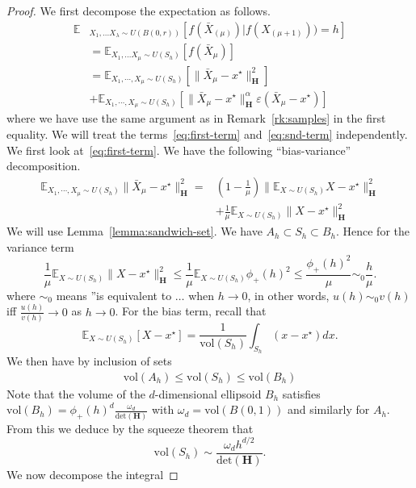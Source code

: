 \begin{proof}
We first decompose the expectation as follows.
\begin{align}
\mathbb{E}&_{X_{1},...X_{\lambda}\sim U(B(0,r))}  \left[f(\bar{X}_{(\mu)})|f(X_{(\mu+1)}))=h\right]\nonumber\\
 & =\mathbb{E}_{X_{1},...X_{\mu}\sim U(S_{h})}\left[f(\bar{X}_{\mu})\right]\nonumber\\
 & =\mathbb{E}_{X_{1},\cdots,X_{\mu}\sim U(S_{h})}\left[\lVert \bar{X}_{\mu}-x^\star\rVert_{\mathbf{H}}^2\right]\label{eq:first-term}\\
 &+\mathbb{E}_{X_{1},\cdots,X_{\mu}\sim U(S_{h})}\left[\lVert\bar{X}_{\mu}-x^\star\rVert^{\alpha}_{\mathbf{H}}\varepsilon(\bar{X}_{\mu}-x^\star)\right]\label{eq:snd-term}
\end{align}
where we have use the same argument as in Remark~\ref{rk:samples} in the first equality.
We will treat the terms~\eqref{eq:first-term} and~\eqref{eq:snd-term} independently. We first look at~\eqref{eq:first-term}. We have the following ``bias-variance'' decomposition.
\begin{align*}
\mathbb{E}_{X_{1},\cdots,X_{\mu}\sim U(S_{h})}\lVert\bar{X}_{\mu}-x^{\star}\rVert^{2}_{\mathbf{H}} 
=&(1-\frac{1}{\mu})\lVert\mathbb{E}_{X\sim U(S_{h})}X-x^{\star}\rVert^{2}_{\mathbf{H}}\\
&+\frac{1}{\mu}\mathbb{E}_{X\sim U(S_{h})}\lVert X-x^{\star}\rVert^{2}_{\mathbf{H}}
\end{align*}
We will use Lemma~\ref{lemma:sandwich-set}. We have $A_h\subset S_h\subset B_h$. Hence for the variance term
\[
\frac{1}{\mu}\mathbb{E}_{X\sim U(S_{h})}\lVert X-x^{\star}\rVert^{2}_{\mathbf{H}}\leq\frac{1}{\mu}\mathbb{E}_{X\sim U(S_{h})} \phi_+(h)^{2} \leq \frac{\phi_+(h)^{2}}{\mu}\sim_{0} \frac{h}{\mu}.
\]
where $\sim_0$ means ''is equivalent to $\dots$ when $h\to0$, in other words, $u(h)\sim_0 v(h)$ iff $\frac{u(h)}{v(h)}\to 0$ as $h\to0$. For the bias term, recall that \[\mathbb{E}_{X\sim U(S_{h})}\left[X-x^\star\right] = \frac{1}{\mathrm{vol}(S_h)}\int_{S_h} (x-x^\star) dx.\] We then have by inclusion of sets
\begin{align*}
    \mathrm{vol}(A_h)\leq \mathrm{vol}(S_h)\leq \mathrm{vol}(B_h)
\end{align*}
Note that the volume of the $d$-dimensional ellipsoid $B_h$ satisfies $\mathrm{vol}(B_h)=\phi_+(h)^{d}\frac{\omega_{d}}{\mathrm{det}(\mathbf{H})}$ with $\omega_{d}=\mathrm{vol}(B(0,1))$ and similarly for $A_h$.
From this we deduce by the squeeze theorem that 
\[\mathrm{vol}(S_h)\sim \frac{\omega_dh^{d/2}}{\mathrm{det}(\mathbf{H})}.\]We now decompose the integral 

\end{proof}

